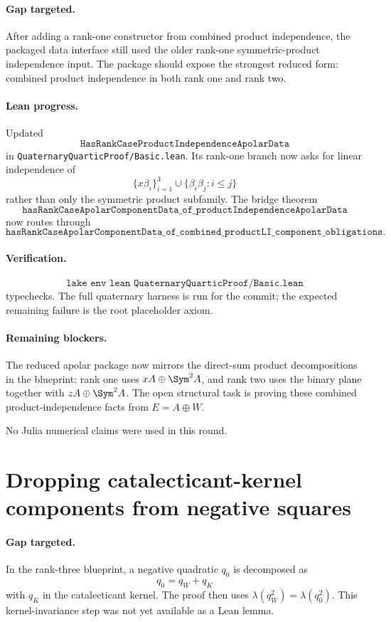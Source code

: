 \documentclass[11pt]{article}
\begin{document}
\paragraph{Gap targeted.}
After adding a rank-one constructor from combined product independence, the
packaged data interface still used the older rank-one symmetric-product
independence input.  The package should expose the strongest reduced form:
combined product independence in both rank one and rank two.

\paragraph{Lean progress.}
Updated
\[
\texttt{HasRankCaseProductIndependenceApolarData}
\]
in \texttt{QuaternaryQuarticProof/Basic.lean}.  Its rank-one branch now asks
for linear independence of
\[
\{x\beta_i\}_{i=1}^3\cup\{\beta_i\beta_j:i\le j\}
\]
rather than only the symmetric product subfamily.  The bridge theorem
\[
\texttt{hasRankCaseApolarComponentData\_of\_productIndependenceApolarData}
\]
now routes through
\[
\texttt{hasRankCaseApolarComponentData\_of\_combined\_productLI\_component\_obligations}.
\]

\paragraph{Verification.}
\[
\texttt{lake env lean QuaternaryQuarticProof/Basic.lean}
\]
typechecks.  The full quaternary harness is run for the commit; the expected
remaining failure is the root placeholder axiom.

\paragraph{Remaining blockers.}
The reduced apolar package now mirrors the direct-sum product decompositions in
the blueprint: rank one uses \(xA\oplus\Sym^2A\), and rank two uses the binary
plane together with \(zA\oplus\Sym^2A\).  The open structural task is proving
these combined product-independence facts from \(E=A\oplus W\).

No Julia numerical claims were used in this round.

\section*{Dropping catalecticant-kernel components from negative squares}

\paragraph{Gap targeted.}
In the rank-three blueprint, a negative quadratic \(q_0\) is decomposed as
\[
q_0=q_W+q_K
\]
with \(q_K\) in the catalecticant kernel.  The proof then uses
\(\lambda(q_W^2)=\lambda(q_0^2)\).  This kernel-invariance step was not yet
available as a Lean lemma.
\end{document}
